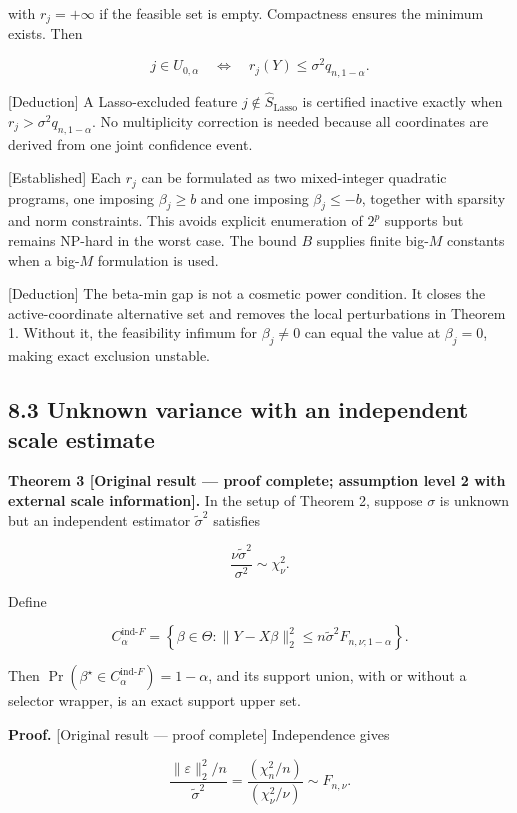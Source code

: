 \documentclass[
  english,
  11pt,
  a4paper,
]{article}
\begin{document}
with $r_j=+\infty$ if the feasible set is empty. Compactness ensures
the minimum exists. Then

$$
j\in U_{0,\alpha}
\quad\Longleftrightarrow\quad
r_j(Y)\le\sigma^2q_{n,1-\alpha}.
$$

{[}Deduction{]} A Lasso-excluded feature
$j\notin\widehat S_{\mathrm{Lasso}}$ is certified inactive exactly
when $r_j>\sigma^2q_{n,1-\alpha}$. No multiplicity correction is
needed because all coordinates are derived from one joint confidence
event.

{[}Established{]} Each $r_j$ can be formulated as two mixed-integer
quadratic programs, one imposing $\beta_j\ge b$ and one imposing
$\beta_j\le-b$, together with sparsity and norm constraints. This
avoids explicit enumeration of $2^p$ supports but remains NP-hard in
the worst case. The bound $B$ supplies finite big-$M$ constants when
a big-$M$ formulation is used.

{[}Deduction{]} The beta-min gap is not a cosmetic power condition. It
closes the active-coordinate alternative set and removes the local
perturbations in Theorem 1. Without it, the feasibility infimum for
$\beta_j\ne0$ can equal the value at $\beta_j=0$, making exact
exclusion unstable.

\subsection{8.3 Unknown variance with an independent scale
estimate}\label{unknown-variance-with-an-independent-scale-estimate}

\textbf{Theorem 3 {[}Original result --- proof complete; assumption
level 2 with external scale information{]}.} In the setup of Theorem 2,
suppose $\sigma$ is unknown but an independent estimator
$\widetilde\sigma^2$ satisfies

$$
\frac{\nu\widetilde\sigma^2}{\sigma^2}\sim\chi_\nu^2.
$$

Define

$$
C_{\alpha}^{\mathrm{ind}\text{-}F}
=
\left\{\beta\in\Theta:
\lVert Y-X\beta\rVert_2^2
\le
n\widetilde\sigma^2F_{n,\nu;1-\alpha}
\right\}.
$$

Then
$\Pr(\beta^\star\in C_{\alpha}^{\mathrm{ind}\text{-}F})=1-\alpha$, and
its support union, with or without a selector wrapper, is an exact
support upper set.

\textbf{Proof.} {[}Original result --- proof complete{]} Independence
gives

$$
\frac{\lVert\varepsilon\rVert_2^2/n}{\widetilde\sigma^2}
=
\frac{(\chi_n^2/n)}{(\chi_\nu^2/\nu)}
\sim F_{n,\nu}.
$$
\end{document}
